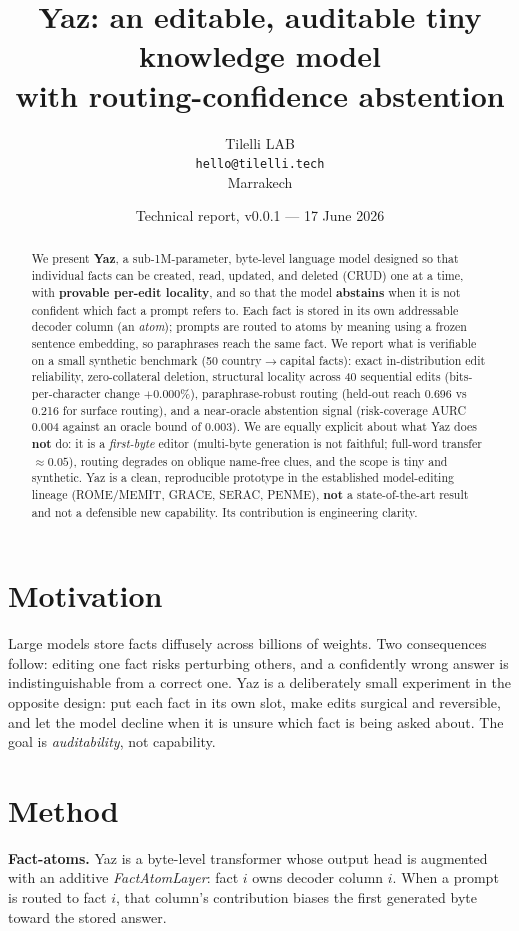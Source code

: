 \documentclass[11pt]{article}
\title{\textbf{Yaz: an editable, auditable tiny knowledge model\\ with routing-confidence abstention}}
\author{Tilelli LAB \\ \texttt{hello@tilelli.tech} \\ Marrakech}
\date{Technical report, v0.0.1 --- 17 June 2026}
\begin{document}
\maketitle

\begin{abstract}
We present \textbf{Yaz}, a sub-1M-parameter, byte-level language model designed so that individual
facts can be created, read, updated, and deleted (CRUD) one at a time, with \textbf{provable per-edit
locality}, and so that the model \textbf{abstains} when it is not confident which fact a prompt refers
to. Each fact is stored in its own addressable decoder column (an \emph{atom}); prompts are routed to
atoms by meaning using a frozen sentence embedding, so paraphrases reach the same fact. We report what
is verifiable on a small synthetic benchmark (50 country$\rightarrow$capital facts): exact
in-distribution edit reliability, zero-collateral deletion, structural locality across 40 sequential
edits (bits-per-character change $+0.000\%$), paraphrase-robust routing (held-out reach 0.696 vs 0.216
for surface routing), and a near-oracle abstention signal (risk-coverage AURC 0.004 against an oracle
bound of 0.003). We are equally explicit about what Yaz does \textbf{not} do: it is a \emph{first-byte}
editor (multi-byte generation is not faithful; full-word transfer $\approx 0.05$), routing degrades on
oblique name-free clues, and the scope is tiny and synthetic. Yaz is a clean, reproducible prototype in
the established model-editing lineage (ROME/MEMIT, GRACE, SERAC, PENME), \textbf{not} a state-of-the-art
result and not a defensible new capability. Its contribution is engineering clarity.
\end{abstract}

\section{Motivation}
Large models store facts diffusely across billions of weights. Two consequences follow: editing one
fact risks perturbing others, and a confidently wrong answer is indistinguishable from a correct one.
Yaz is a deliberately small experiment in the opposite design: put each fact in its own slot, make
edits surgical and reversible, and let the model decline when it is unsure which fact is being asked
about. The goal is \emph{auditability}, not capability.

\section{Method}
\textbf{Fact-atoms.} Yaz is a byte-level transformer whose output head is augmented with an additive
\emph{FactAtomLayer}: fact $i$ owns decoder column $i$. When a prompt is routed to fact $i$, that
column's contribution biases the first generated byte toward the stored answer.
\end{document}
